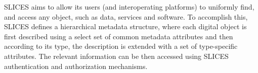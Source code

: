     


SLICES aims to allow its users (and interoperating platforms) to uniformly find, and access any object, such as data, services and software. To accomplish this, SLICES defines a hierarchical metadata structure, where each digital object is first described using a select set of common metadata attributes and then according to its type, the description is extended with a set of type-specific attributes.
The relevant information can be then accessed using SLICES authentication and authorization mechanisms. 




